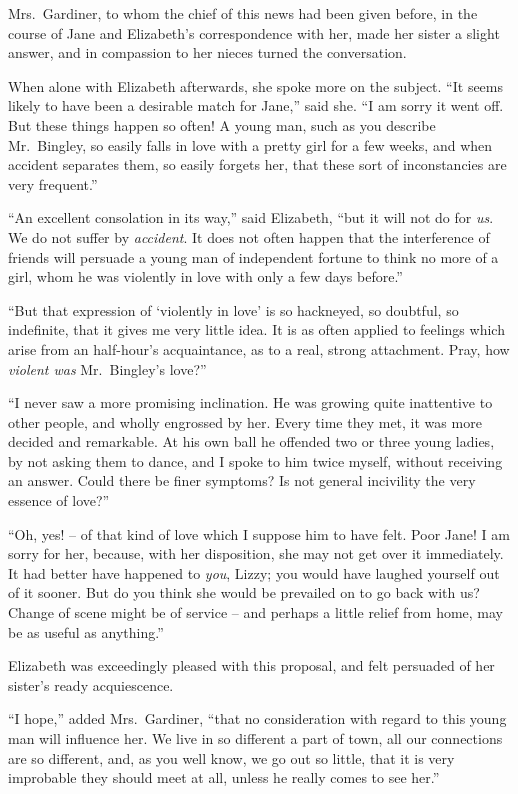 Mrs.\ Gardiner, to whom the chief of this news had been
given before, in the course of Jane and Elizabeth’s
correspondence with her, made her sister a slight answer, and
in compassion to her nieces turned the conversation.

When alone with Elizabeth afterwards, she spoke more
on the subject. “It seems likely to have been a desirable
match for Jane,” said she. “I am sorry it went off.
But these things happen so often! A young man, such as
you describe Mr.\ Bingley, so easily falls in love with
a pretty girl for a few weeks, and when accident separates
them, so easily forgets her, that these sort of inconstancies
are very frequent.”

“An excellent consolation in its way,” said Elizabeth,
“but it will not do for \textit{us}. We do not suffer by \textit{accident}.
It does not often happen that the interference of friends
will persuade a young man of independent fortune to
think no more of a girl, whom he was violently in love
with only a few days before.”

“But that expression of ‘violently in love’ is so
hackneyed, so doubtful, so indefinite, that it gives me
very little idea. It is as often applied to feelings which
arise from an half-hour’s acquaintance, as to a real,
strong attachment. Pray, how \textit{violent was} Mr.\ Bingley’s
love?”

“I never saw a more promising inclination. He was
growing quite inattentive to other people, and wholly
engrossed by her. Every time they met, it was more
decided and remarkable. At his own ball he offended two
or three young ladies, by not asking them to dance, and
I spoke to him twice myself, without receiving an answer.
Could there be finer symptoms? Is not general incivility
the very essence of love?”

“Oh, yes! -- of that kind of love which I suppose him
to have felt. Poor Jane! I am sorry for her, because,
with her disposition, she may not get over it immediately.
It had better have happened to \textit{you}, Lizzy; you would
have laughed yourself out of it sooner. But do you think
she would be prevailed on to go back with us? Change
of scene might be of service -- and perhaps a little relief
from home, may be as useful as anything.”

Elizabeth was exceedingly pleased with this proposal,
and felt persuaded of her sister’s ready acquiescence.

“I hope,” added Mrs.\ Gardiner, “that no consideration
with regard to this young man will influence her. We live
in so different a part of town, all our connections are so
different, and, as you well know, we go out so little, that
it is very improbable they should meet at all, unless he
really comes to see her.”


